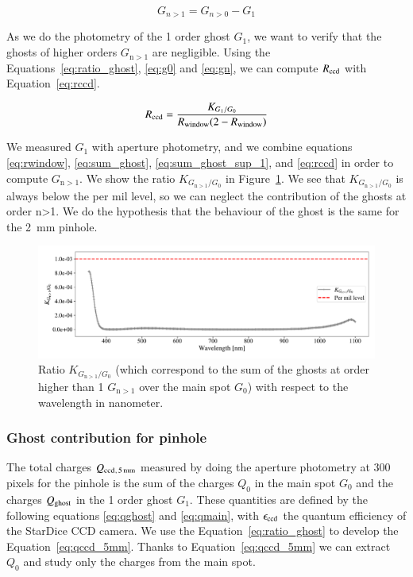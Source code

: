  \begin{equation}
     G_{n>1} = G_{n>0} - G_1
     \label{eq:sum_ghost_sup_1}
 \end{equation}

As we do the photometry of the 1 order ghost $G_1$, we want to verify that the ghosts of higher orders $G_{\mathrm{n}>1}$ are negligible. Using the Equations~\ref{eq:ratio_ghost}, \ref{eq:g0} and \ref{eq:gn}, we can compute $R_{\mathrm{ccd}}$ with Equation~\ref{eq:rccd}.

\begin{equation}
    R_{\mathrm{ccd}} = \frac{K_{G_1/G_0}}{R_{\mathrm{window}} (2 - R_{\mathrm{window}})}
    \label{eq:rccd}
\end{equation}

We measured $G_1$ with aperture photometry, and we combine equations \ref{eq:rwindow}, \ref{eq:sum_ghost}, \ref{eq:sum_ghost_sup_1}, and \ref{eq:rccd} in order to compute $G_{\mathrm{n}>1}$. We show the ratio $K_{G_{\mathrm{n}>1}/G_0}$ in Figure~\ref{fig:ratio_ginf_g0}. We see that $K_{G_{\mathrm{n}>1}/G_0}$ is always below the per mil level, so we can neglect the contribution of the ghosts at order n>1. We do the hypothesis that the behaviour of the ghost is the same for the \SI{2}{\milli\meter} pinhole.

\begin{figure}[h]
    \centering
    \includegraphics[width=\columnwidth]{fig/ratio_g1_ginf.pdf}
    \caption{Ratio $K_{G_{\mathrm{n}>1}/G_0}$ (which correspond to the sum of the ghosts at order higher than 1 $G_{\mathrm{n}>1}$ over the main spot $G_0$) with respect to the wavelength in nanometer.}
    \label{fig:ratio_ginf_g0}
\end{figure}

\subsubsection{Ghost contribution for \bpinhole pinhole}

The total charges $Q_{\mathrm{ccd}}{}_{, \, \SI{5}{\milli\meter}}$ measured by doing the aperture photometry at 300 pixels for the \bpinhole pinhole is the sum of the charges $Q_0$ in the main spot $G_0$ and the charges $Q_{\mathrm{ghost}}$ in the 1 order ghost $G_1$. These quantities are defined by the following equations \ref{eq:qghost} and \ref{eq:qmain}, with $\epsilon_{\mathrm{ccd}}$ the quantum efficiency of the StarDice CCD camera. We use the Equation~\ref{eq:ratio_ghost} to develop the Equation~\ref{eq:qccd_5mm}. Thanks to Equation~\ref{eq:qccd_5mm} we can extract $Q_0$ and study only the charges from the main spot.

